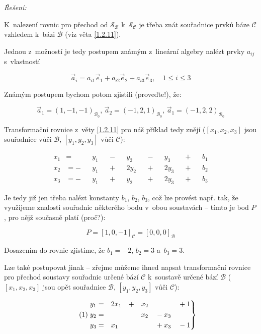\documentclass[a4paper, 12pt]{article}
\begin{document}
\noindent \textit{Řešení:}


\noindent K~nalezení rovnic pro přechod od $\mathcal{S_B}$ k~$\mathcal{S_C}$ je třeba znát souřadnice prvků báze $\mathcal{C}$ vzhledem k~bázi $\mathcal{B}$ (viz věta \ref{1.2.11}).


Jednou z~možností je tedy postupem známým z~lineární algebry nalézt prvky $a_{ij}$ s~vlastností

$$\vec{a}_i=a_{i1}\vec{e}_1+a_{i2}\vec{e}_2+a_{i3}\vec{e}_3,\quad 1\leq i\leq 3$$

\noindent Známým postupem bychom potom zjistili (proveďte!), že:

$$\vec{a}_1=(1,-1,-1)_{\mathcal{B}_0},\, \vec{a}_2=(-1,2,1)_{\mathcal{B}_0},\, \vec{a}_1=(-1,2,2)_{\mathcal{B}_0}$$

\noindent Transformační rovnice z~věty \ref{1.2.11} pro náš příklad tedy znějí ($[x_1, x_2, x_3]$ jsou souřadnice vůči $\mathcal{B}$, $[y_1, y_2, y_3]$ vůči $\mathcal{C}$):

\begin{equation*}
	\begin{aligned}
		x_1 & =  &  & y_1 &  & - &  & y_2  &  & - &  & y_3  &  & + &  & b_1 \\
		x_2 & =- &  & y_1 &  & + &  & 2y_2 &  & + &  & 2y_3 &  & + &  & b_2 \\
		x_3 & =- &  & y_1 &  & + &  & y_2  &  & + &  & 2y_3 &  & + &  & b_3
	\end{aligned}
\end{equation*}

\noindent Je tedy již jen třeba nalézt konstanty $b_1$, $b_2$, $b_3$, což lze provést např. tak, že využijeme znalosti souřadnic některého bodu v~obou soustavách -- tímto je bod $P$, pro nějž současně platí (proč?):

$$P=[1,0,-1]_{\mathcal{C}}=[0,0,0]_{\mathcal{B}}$$

\noindent Dosazením do rovnic zjistíme, že $b_1=-2$, $b_2=3$ a~$b_3=3$.

Lze také postupovat jinak -- zřejme můžeme ihned napsat transformační rovnice pro přechod soustavy souřadnic určené bází $\mathcal{C}$ k~soustavě určené bází $\mathcal{B}$ ($[x_1, x_2, x_3]$ jsou opět souřadnice $\mathcal{B}$, $[y_1, y_2, y_3]$ vůči $\mathcal{C}$):

\begin{equation*}
	\tag{1}\label{eq:1}
	\begin{rcases*}
		\begin{aligned}
			y_1 & = &  & 2x_1 &  & + &  & x_2 &  &       &  & + 1 \\
			y_2 & = &  &      &  &   &  & x_2 &  & - x_3 &  &     \\
			y_3 & = &  & x_1  &  &   &  &     &  & + x_3 &  & - 1
		\end{aligned}
	\end{rcases*}
\end{equation*}
\end{document}
